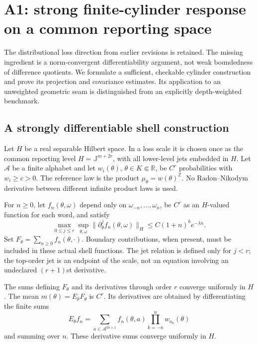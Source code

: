 \section{A1: strong finite-cylinder response on a common reporting space}
\label{sec:r33-a1}

The distributional loss direction from earlier revisions is retained. The missing ingredient is a norm-convergent differentiability argument, not weak boundedness of difference quotients. We formulate a sufficient, checkable cylinder construction and prove its projection and covariance estimates. Its application to an unweighted geometric seam is distinguished from an explicitly depth-weighted benchmark.

\subsection{A strongly differentiable shell construction}
Let $H$ be a real separable Hilbert space. In a loss scale it is chosen once as the common reporting level $H=\mathbb J^{m+2r}$, with all lower-level jets embedded in $H$. Let $\mathcal A$ be a finite alphabet and let $w_i(\theta)$, $\theta\in K\Subset\mathbb R$, be $C^r$ probabilities with $w_i\ge c>0$. The reference law is the product $\mu_\theta=w(\theta)^{\mathbb Z}$. No Radon--Nikodym derivative between different infinite product laws is used.

For $n\ge0$, let $f_n(\theta,\omega)$ depend only on $\omega_{-n},\ldots,\omega_n$, be $C^r$ as an $H$-valued function for each word, and satisfy
\begin{equation}\label{eq:r33-a1-shell}
 \max_{0\le j\le r}\sup_{\theta,\omega}
 \|\partial_\theta^j f_n(\theta,\omega)\|_H
 \le C(1+n)^b e^{-\lambda n}.
\end{equation}
Set $F_\theta=\sum_{n\ge0}f_n(\theta,\cdot)$. Boundary contributions, when present, must be included in these actual shell functions. The jet relation is defined only for $j<r$; the top-order jet is an endpoint of the scale, not an equation involving an undeclared $(r+1)$st derivative.

\begin{theorem}
\label{thm:r33-a1-response}
The sums defining $F_\theta$ and its derivatives through order $r$ converge uniformly in $H$. The mean $m(\theta)=E_\theta F_\theta$ is $C^r$. Its derivatives are obtained by differentiating the finite sums
\[
 E_\theta f_n=\sum_{a\in\mathcal A^{2n+1}}
      f_n(\theta,a)\prod_{k=-n}^n w_{a_k}(\theta)
\]
and summing over $n$. These derivative sums converge uniformly in $H$.
\end{theorem}


